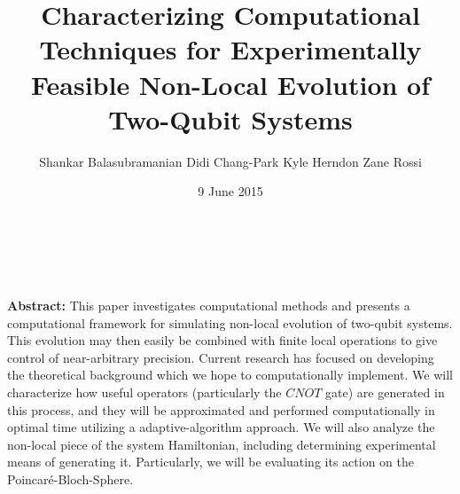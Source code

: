 \documentclass[12pt]{beamer}
\title{Characterizing Computational Techniques for Experimentally Feasible Non-Local Evolution of Two-Qubit Systems}
\author{Shankar Balasubramanian\hspace{1em} Didi Chang-Park\hspace{1em} Kyle Herndon\hspace{1em} Zane Rossi}
\institute{TJHSST Modern Physics and Optics Lab}
\date{9 June 2015}
\renewcommand{\maketitle}{%
	\begin{center}%
		\Huge\inserttitle\\[5mm]%
		\Large\insertauthor\\[5mm]%
		\Large\insertinstitute%
	\end{center}%
	\vspace*{-1.5ex}%
}
\begin{document}
\centering
	\begin{frame}{\maketitle}
	
					   {\bf{Abstract:}} This paper investigates computational methods and presents a computational framework for simulating non-local evolution of two-qubit systems. This evolution may then easily be combined with finite local operations to give control of near-arbitrary precision. Current research has focused on developing the theoretical background which we hope to computationally implement. We will characterize how useful operators (particularly the $CNOT$ gate) are generated in this process, and they will be approximated and performed computationally in optimal time utilizing a adaptive-algorithm approach. We will also analyze the non-local piece of the system Hamiltonian, including determining experimental means of generating it.  Particularly, we will be evaluating its action on the Poincar\'{e}-Bloch-Sphere.
\vfill

		\begin{columns}
			\begin{column}{.45\textwidth}
			

\end{column}
\end{columns}
\end{frame}
\end{document}
